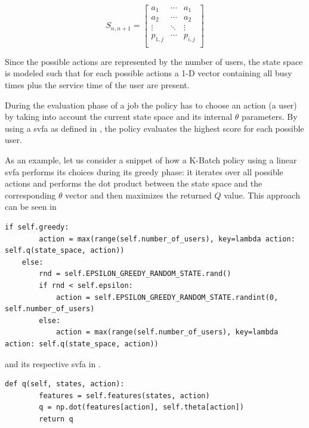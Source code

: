 \begin{equation}
\label{eq:kbatch_sp}
	S_{n,n+1} = 
	\begin{bmatrix}
	a_1 & \cdots & a_1 \\
	a_2 & \cdots & a_2 \\
	\vdots & \ddots & \vdots \\
	p_{1,j} & \cdots & p_{i,j} \\
	\end{bmatrix}
\end{equation}

Since the possible actions are represented by the number of users, the state space is modeled such that for each possible actions a 1-D vector containing all busy times plus the service time of the user are present.

During the evaluation phase of a job the policy has to choose an action (\ie a user) by taking into account the current state space and its internal $\theta$ parameters. By using a \gls{svfa} as defined in , the policy evaluates the highest score for each possible user.

As an example, let us consider a snippet of how a K-Batch policy using a linear \gls{svfa} performs its choices during its greedy phase: it iterates over all possible actions and performs the dot product between the state space and the corresponding $\theta$ vector and then maximizes the returned $Q$ value. This approach can be seen in  

\begin{lstlisting}[caption=\gls{ep} approach,label=lst:e_greedy,style=CustomPython]
    if self.greedy:
        action = max(range(self.number_of_users), key=lambda action: self.q(state_space, action))
    else:
        rnd = self.EPSILON_GREEDY_RANDOM_STATE.rand()
        if rnd < self.epsilon:
            action = self.EPSILON_GREEDY_RANDOM_STATE.randint(0, self.number_of_users)
        else:
            action = max(range(self.number_of_users), key=lambda action: self.q(state_space, action))
\end{lstlisting}

and its respective \gls{svfa} in .

\begin{lstlisting}[caption=\glsentryfull{svfa},label=lst:value_f_approx,style=CustomPython]
    def q(self, states, action):
        features = self.features(states, action)
        q = np.dot(features[action], self.theta[action])
        return q
\end{lstlisting}
 
